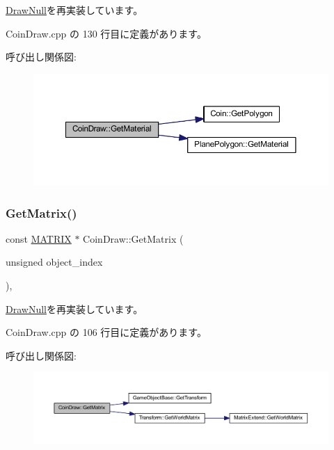 \mbox{\hyperlink{class_draw_null_a84969d22d3436986f214e9896fe44fc6}{Draw\+Null}}を再実装しています。



 Coin\+Draw.\+cpp の 130 行目に定義があります。

呼び出し関係図\+:\nopagebreak
\begin{figure}[H]
\begin{center}
\leavevmode
\includegraphics[width=350pt]{class_coin_draw_a869a6b7273b273048dd56822fae4d644_cgraph}
\end{center}
\end{figure}
\mbox{\label{class_coin_draw_a8f5fd8668a4c66fe31446cc6f7c4afd7}} 
\subsubsection{\texorpdfstring{Get\+Matrix()}{GetMatrix()}}
{\footnotesize\ttfamily const \mbox{\hyperlink{_vector3_d_8h_a032295cd9fb1b711757c90667278e744}{M\+A\+T\+R\+IX}} $\ast$ Coin\+Draw\+::\+Get\+Matrix (\begin{DoxyParamCaption}\item[{unsigned}]{object\+\_\+index }\end{DoxyParamCaption})\hspace{0.3cm}{\ttfamily [override]}, {\ttfamily [virtual]}}



\mbox{\hyperlink{class_draw_null_adede079e9c11a756090740b20bb43022}{Draw\+Null}}を再実装しています。



 Coin\+Draw.\+cpp の 106 行目に定義があります。

呼び出し関係図\+:\nopagebreak
\begin{figure}[H]
\begin{center}
\leavevmode
\includegraphics[width=350pt]{class_coin_draw_a8f5fd8668a4c66fe31446cc6f7c4afd7_cgraph}
\end{center}
\end{figure}
\mbox{\label{class_coin_draw_a178c8d88effe55aaad7d0e45b02e0566}} 
